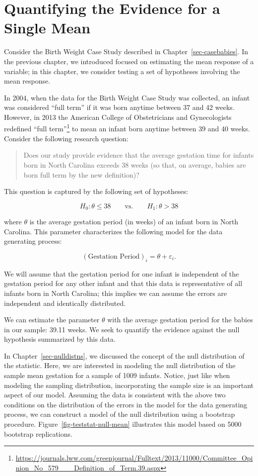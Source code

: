 \documentclass[
  letterpaper,
  DIV=11,
  numbers=noendperiod]{scrreprt}
\theoremstyle{definition}
\theoremstyle{definition}
\theoremstyle{plain}
\theoremstyle{remark}
\begin{document}
\hypertarget{sec-teststat}{%
\chapter{Quantifying the Evidence for a Single
Mean}\label{sec-teststat}}

Consider the Birth Weight Case Study described in
Chapter~\ref{sec-casebabies}. In the previous chapter, we introduced
focused on estimating the mean response of a variable; in this chapter,
we consider testing a set of hypotheses involving the mean response.

In 2004, when the data for the Birth Weight Case Study was collected, an
infant was considered ``full term'' if it was born anytime between 37
and 42 weeks. However, in 2013 the American College of Obstetricians and
Gynecologists redefined ``full term''\footnote{\url{https://journals.lww.com/greenjournal/Fulltext/2013/11000/Committee_Opinion_No_579___Definition_of_Term.39.aspx}}
to mean an infant born anytime between 39 and 40 weeks. Consider the
following research question:

\begin{quote}
Does our study provide evidence that the average gestation time for
infants born in North Carolina exceeds 38 weeks (so that, on average,
babies are born full term by the new definition)?
\end{quote}

This question is captured by the following set of hypotheses:

\[H_0: \theta \leq 38 \qquad \text{vs.} \qquad H_1: \theta > 38\]

where \(\theta\) is the average gestation period (in weeks) of an infant
born in North Carolina. This parameter characterizes the following model
for the data generating process:

\[(\text{Gestation Period})_i = \theta + \varepsilon_i.\]

We will assume that the gestation period for one infant is independent
of the gestation period for any other infant and that this data is
representative of all infants born in North Carolina; this implies we
can assume the errors are independent and identically distributed.

We can estimate the parameter \(\theta\) with the average gestation
period for the babies in our sample: 39.11 weeks. We seek to quantify
the evidence against the null hypothesis summarized by this data.

In Chapter~\ref{sec-nulldistns}, we discussed the concept of the null
distribution of the statistic. Here, we are interested in modeling the
null distribution of the sample mean gestation for a sample of 1009
infants. Notice, just like when modeling the sampling distribution,
incorporating the sample size is an important aspect of our model.
Assuming the data is consistent with the above two conditions on the
distribution of the errors in the model for the data generating process,
we can construct a model of the null distribution using a bootstrap
procedure. Figure~\ref{fig-teststat-null-mean} illustrates this model
based on 5000 bootstrap replications.
\end{document}
